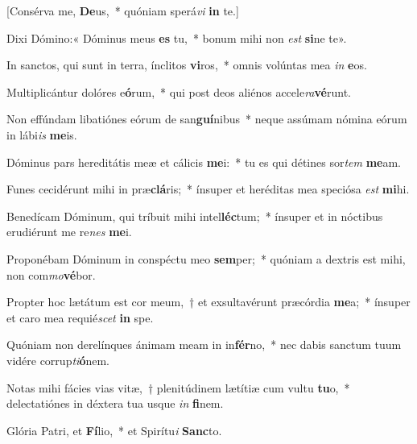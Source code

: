 \item {[Consérva me, \textbf{De}us,~* quóniam sperá\textit{vi} \textbf{in} te.]}

\item Dixi Dómino:« Dóminus meus \textbf{es} tu,~* bonum mihi non \textit{est} \textbf{si}ne te».

\item In sanctos, qui sunt in terra, ínclitos \textbf{vi}ros,~* omnis volúntas mea \textit{in} \textbf{e}os.

\item Multiplicántur dolóres e\textbf{ó}rum,~* qui post deos aliénos accele\textit{ra}\textbf{vé}runt.

\item Non effúndam libatiónes eórum de san\textbf{guí}nibus~* neque assúmam nómina eórum in lábi\textit{is} \textbf{me}is.

\item Dóminus pars hereditátis meæ et cálicis \textbf{me}i:~* tu es qui détines sor\textit{tem} \textbf{me}am.

\item Funes cecidérunt mihi in præ\textbf{clá}ris;~* ínsuper et heréditas mea speciósa \textit{est} \textbf{mi}hi.

\item Benedícam Dóminum, qui tríbuit mihi intel\textbf{léc}tum;~* ínsuper et in nóctibus erudiérunt me re\textit{nes} \textbf{me}i.

\item Proponébam Dóminum in conspéctu meo \textbf{sem}per;~* quóniam a dextris est mihi, non com\textit{mo}\textbf{vé}bor.

\item Propter hoc lætátum est cor meum,~† et exsultavérunt præcórdia \textbf{me}a;~* ínsuper et caro mea requié\textit{scet} \textbf{in} spe.

\item Quóniam non derelínques ánimam meam in in\textbf{fér}no,~* nec dabis sanctum tuum vidére corrup\textit{ti}\textbf{ó}nem.

\item Notas mihi fácies vias vitæ,~† plenitúdinem lætítiæ cum vultu \textbf{tu}o,~* delectatiónes in déxtera tua usque \textit{in} \textbf{fi}nem.

\item Glória Patri, et \textbf{Fí}lio,~* et Spirítu\textit{i} \textbf{Sanc}to.


